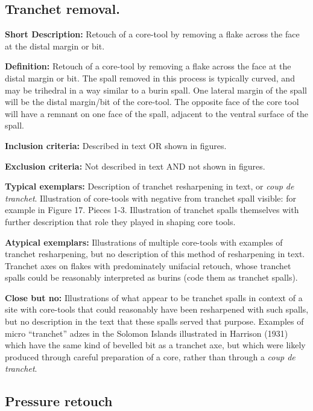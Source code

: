 \documentclass[
]{article}
\begin{document}
\hypertarget{tranchet-removal.}{%
\subsection{Tranchet removal.}\label{tranchet-removal.}}

\textbf{Short Description:} Retouch of a core-tool by removing a flake
across the face at the distal margin or bit.

\textbf{Definition:} Retouch of a core-tool by removing a flake across
the face at the distal margin or bit. The spall removed in this process
is typically curved, and may be trihedral in a way similar to a burin
spall. One lateral margin of the spall will be the distal margin/bit of
the core-tool. The opposite face of the core tool will have a remnant on
one face of the spall, adjacent to the ventral surface of the spall.

\textbf{Inclusion criteria:} Described in text OR shown in figures.

\textbf{Exclusion criteria:} Not described in text AND not shown in
figures.

\textbf{Typical exemplars:} Description of tranchet resharpening in
text, or \emph{coup de tranchet}. Illustration of core-tools with
negative from tranchet spall visible: for example in Figure 17. Pieces
1-3. Illustration of tranchet spalls themselves with further description
that role they played in shaping core tools.

\textbf{Atypical exemplars:} Illustrations of multiple core-tools with
examples of tranchet resharpening, but no description of this method of
resharpening in text. Tranchet axes on flakes with predominately
unifacial retouch, whose tranchet spalls could be reasonably interpreted
as burins (code them as tranchet spalls).

\textbf{Close but no:} Illustrations of what appear to be tranchet
spalls in context of a site with core-tools that could reasonably have
been resharpened with such spalls, but no description in the text that
these spalls served that purpose. Examples of micro ``tranchet'' adzes
in the Solomon Islands illustrated in Harrison (1931) which have the
same kind of bevelled bit as a tranchet axe, but which were likely
produced through careful preparation of a core, rather than through a
\emph{coup de tranchet}.

\hypertarget{pressure-retouch}{%
\subsection{Pressure retouch}\label{pressure-retouch}}
\end{document}
